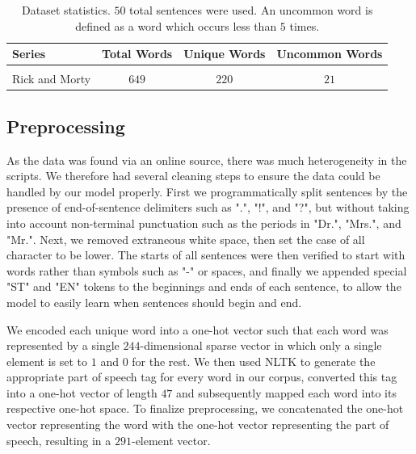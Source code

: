 \documentclass[conference]{IEEEtran}
\begin{document}
\begin{table}[!htbp]
\caption{Dataset statistics. $50$ total sentences were used. An uncommon word is defined as a word which occurs less than $5$ times.}
\label{tab:data}
\begin{center}
\begin{tabular}{lccc}

Series & Total Words & Unique Words & Uncommon Words\\
\hline{}\\
Rick and Morty & $649$ & $220$ & $21$\\

\end{tabular}
\end{center}
\vspace{-1em}
\end{table}

\subsection{Preprocessing}

As the data was found via an online source, there was much heterogeneity in the scripts.  We therefore had several cleaning steps to ensure the data could be handled by our model properly.  First we programmatically split sentences by the presence of end-of-sentence delimiters such as ".", "!", and "?", but without taking into account non-terminal punctuation such as the periods in "Dr.", "Mrs.", and "Mr.".  Next, we removed extraneous white space, then set the case of all character to be lower.  The starts of all sentences were then verified to start with words rather than symbols such as "-" or spaces, and finally we appended special "ST" and "EN" tokens to the beginnings and ends of each sentence, to allow the model to easily learn when sentences should begin and end.

We encoded each unique word into a one-hot vector such that each word was represented by a single $244$-dimensional sparse vector in which only a single element is set to $1$ and $0$ for the rest.  We then used NLTK \cite{bird2004nltk} to generate the appropriate part of speech tag for every word in our corpus, converted this tag into a one-hot vector of length $47$ and subsequently mapped each word into its respective one-hot space.  To finalize preprocessing, we concatenated the one-hot vector representing the word with the one-hot vector representing the part of speech, resulting in a $291$-element vector.
\end{document}
